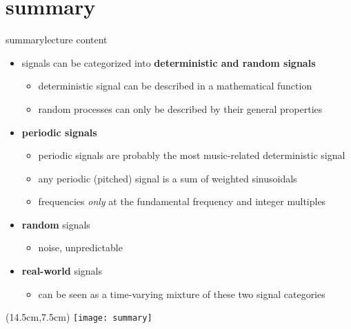     \section{summary}
        \begin{frame}{summary}{lecture content}
            \begin{itemize}
                \item   signals can be categorized into \textbf{deterministic and random signals}
                    \begin{itemize}
                        \item   deterministic signal can be described in a mathematical function
                        \item   random processes can only be described by their general properties
                    \end{itemize}
                \bigskip
                \item      \textbf{periodic signals}
                    \begin{itemize}
                        \item   periodic signals are probably the most music-related deterministic signal
                        \item   any periodic (pitched) signal is a sum of weighted sinusoidals
                        \item   frequencies \textit{only} at the fundamental frequency and integer multiples
                    \end{itemize}
                \bigskip
                \item   \textbf{random} signals
                    \begin{itemize}
                        \item   noise, unpredictable
                    \end{itemize}
                \bigskip
                \item   \textbf{real-world} signals
                    \begin{itemize}
                        \item   can be seen as a time-varying mixture of these two signal categories
                    \end{itemize}
            \end{itemize}
            \begin{textblock*}{100mm}(14.5cm,7.5cm)
                \texttt{[image: summary]}
            \end{textblock*}
        \end{frame}

